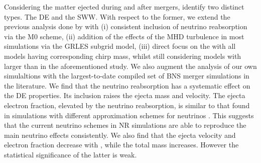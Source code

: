 Considering the matter ejected during and after mergers, identify two distinct types.
The \ac{DE} and the \pmerg{} \ac{SWW}. 
With respect to the former, we extend the previous analysis done by \citet{Radice:2018pdn} 
with 
(i) consistent inclusion of neutrino reabsorption via the M0 scheme,
(ii) addition of the effects of the \ac{MHD} turbulence in most simulations 
via the \ac{GRLES} subgrid model, 
(iii) direct focus on the \GW{} with all models having corresponding chirp mass,
whilst still considering models with larger \mr{} than in the aforementioned study.
We also augment the analysis of our own simulaltions with the largest-to-date compiled
set of \ac{BNS} merger simulations in the literature. 
%
We find that the neutrino reabsorption has a systematic effect on the \ac{DE} properties.
Its inclusion raises the ejecta mass and velocity.
The ejecta electron fraction, elevated by the neutrino reabsorption, is similar to that 
found in simulations with different approximation schemes for neutrinos
\citep{Sekiguchi:2016bjd,Vincent:2019kor}. 
This suggests that the current neutrino schemes in \ac{NR} simulations are able to 
reproduce the main neutrino effects consistently.
We also find that the ejecta velocity and electron fraction decrease with \mr{}, while 
the total mass increases. However the statistical significance of the latter is weak.

